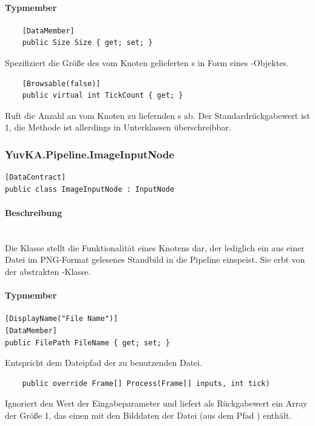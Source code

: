 \paragraph{Typmember}
\begin{itemize}

	\begin{verbatim}
	[DataMember]
	public Size Size { get; set; }
	\end{verbatim}
	Spezifiziert die Größe des vom Knoten gelieferten s in Form eines -Objektes.

	\begin{verbatim}
	[Browsable(false)]
	public virtual int TickCount { get; }
	\end{verbatim}
	Ruft die Anzahl an vom Knoten zu liefernden s ab. Der Standardrückgabewert ist 1, die Methode ist allerdings in Unterklassen überschreibbar.

\end{itemize}

\subsubsection{YuvKA.Pipeline.ImageInputNode}

\begin{verbatim}
[DataContract]
public class ImageInputNode : InputNode
\end{verbatim}

\paragraph{Beschreibung}~\\
Die Klasse  stellt die Funktionalität eines Knotens dar, der lediglich ein aus einer Datei im PNG-Format gelesenes Standbild in die Pipeline einspeist. Sie erbt von der abstrakten -Klasse.

\paragraph{Typmember}
\begin{itemize}

	\begin{verbatim}
[DisplayName("File Name")]
[DataMember]
public FilePath FileName { get; set; }
	\end{verbatim}
	Entspricht dem Dateipfad der zu benutzenden Datei.

	\begin{verbatim}
	public override Frame[] Process(Frame[] inputs, int tick)
	\end{verbatim}
	Ignoriert den Wert der Eingabeparameter und liefert als Rückgabewert ein Array der Größe 1, das einen  mit den Bilddaten der Datei (aus dem Pfad ) enthält.

\end{itemize}
